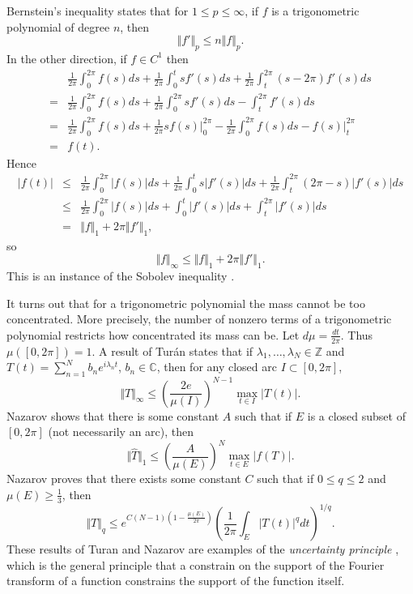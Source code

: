 \documentclass{article}
\newcommand{\norm}[1]{\Vert #1 \Vert}
\theoremstyle{definition}
\begin{document}
  
Bernstein's inequality \cite[p.~50, Exercise~7.16]{katznelson} states that for $1 \leq p \leq \infty$, if $f$
is a trigonometric polynomial of degree $n$, then
\[
\norm{f'}_p \leq n \norm{f}_p.
\]
In the other direction, if $f \in C^1$ then
\[
\begin{split}
&\frac{1}{2\pi} \int_0^{2\pi} f(s) ds +\frac{1}{2\pi} \int_0^t s f'(s) ds + \frac{1}{2\pi} \int_t^{2\pi} (s-2\pi) f'(s)ds\\
=&\frac{1}{2\pi} \int_0^{2\pi} f(s) ds+\frac{1}{2\pi} \int_0^{2\pi} s f'(s) ds - \int_t^{2\pi} f'(s) ds\\
=&\frac{1}{2\pi} \int_0^{2\pi} f(s) ds + \frac{1}{2\pi}sf(s)\Big|_0^{2\pi}-\frac{1}{2\pi} \int_0^{2\pi} f(s) ds-f(s)\Big|_t^{2\pi}\\
=&f(t).
\end{split}
\]
Hence
\begin{eqnarray*}
|f(t)|&\leq&\frac{1}{2\pi}\int_0^{2\pi} |f(s)|ds+\frac{1}{2\pi}\int_0^t s|f'(s)|ds+\frac{1}{2\pi} \int_t^{2\pi}(2\pi-s)|f'(s)|ds\\
&\leq&\frac{1}{2\pi}\int_0^{2\pi} |f(s)|ds+\int_0^t |f'(s)|ds + \int_t^{2\pi} |f'(s)| ds\\
&=&\norm{f}_1+2\pi\norm{f'}_1,
\end{eqnarray*}
so
\[
\norm{f}_\infty \leq \norm{f}_1+2\pi\norm{f'}_1.
\]
This is an instance of the Sobolev inequality \cite{oh}.

It turns out that for a trigonometric polynomial the mass cannot
be too concentrated. More precisely, the number of nonzero terms of a trigonometric polynomial restricts how concentrated its mass can be.  
Let $d\mu=\frac{dt}{2\pi}$. Thus $\mu([0,2\pi])=1$. 
A result of Tur\'an \cite[p.~89, Lemma 1]{montgomery} states that if $\lambda_1,\ldots,\lambda_N \in \mathbb{Z}$ and
$T(t)=\sum_{n=1}^N b_n e^{i\lambda_n t}$, $b_n \in \mathbb{C}$, then for any closed arc $I \subset [0,2\pi]$,
\[
\norm{T}_\infty \leq \left( \frac{2 e}{\mu(I)} \right)^{N-1} \max_{t \in I} |T(t)|.
\]
Nazarov \cite[p.~452]{havin} shows  that there is some constant $A$ such that if $E$ is a closed subset of $[0,2\pi]$ (not necessarily an arc),
then
\[
\norm{\hat{T}}_1 \leq \left( \frac{A}{\mu(E)} \right)^N \max_{t \in E} |f(T)|.
\]
Nazarov \cite{MR1771766} proves that there exists some constant $C$ such that if $0 \leq q \leq 2$ and $\mu(E)\geq \frac{1}{3}$, then 
\[
\norm{T}_q \leq e^{C(N-1)\left(1-\frac{\mu(E)}{2\pi}\right)} \left( \frac{1}{2\pi} \int_E |T(t)|^q dt \right)^{1/q}.
\]
These results of Turan and Nazarov are examples of the {\em uncertainty principle} \cite{MR1448337}, which is the general principle that a constrain on the support of the Fourier
transform of a function constrains the support of the function itself. 
\end{document}
